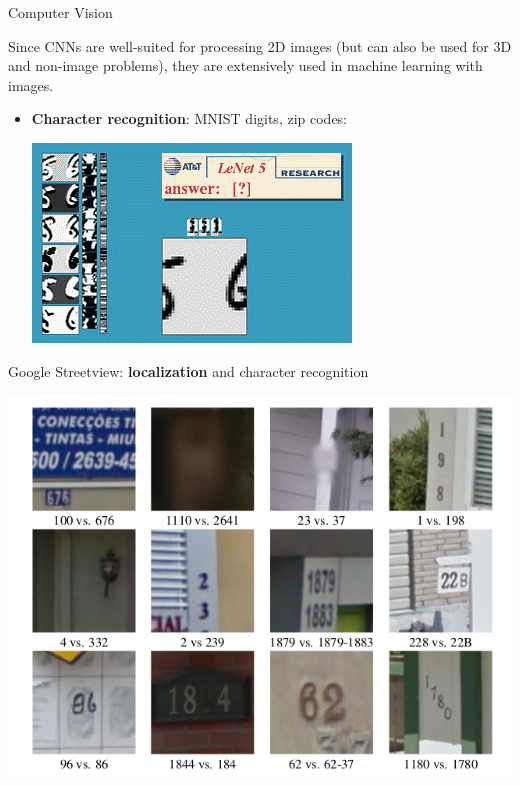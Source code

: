 \documentclass[12pt,t]{beamer}
\begin{document}
\begin{frame}{Computer Vision}

Since CNNs are well-suited for processing 2D images (but can also be used for 3D and non-image problems),  they are extensively used in machine learning with images.

\begin{itemize}
\item {\bf Character recognition}: MNIST digits, zip codes:

\centerline{
\href{http://yann.lecun.com/exdb/lenet/gifs/asamples.gif}{\includegraphics[height=0.3\textheight]{./images/lenet-22.png}}
}
\end{itemize}
\end{frame}

\begin{frame}

Google Streetview: {\bf localization} and character recognition

\centerline{
\includegraphics[height=0.8\textheight]{./images/streetview.png} 
}

\end{frame}
\end{document}
